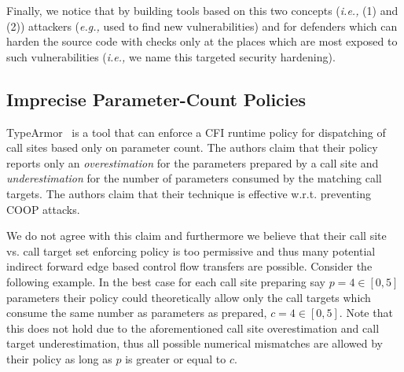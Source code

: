 Finally, we notice that by building tools based on this two concepts (\textit{i.e.,} (1) and (2))
attackers (\textit{e.g.,} used to find new vulnerabilities) and for defenders which can 
harden the source code with checks only at the places which are most exposed 
to such vulnerabilities (\textit{i.e.,} we name this targeted security hardening).

\subsection{Imprecise Parameter-Count Policies}
\label{Too Permissive Parameter-Based Policies}
TypeArmor~\cite{veen:typearmor} is a tool that can enforce a CFI runtime policy for dispatching of call sites based only on
parameter count. The authors claim that their policy reports only an \textit{overestimation} for the parameters prepared by a call site
and \textit{underestimation} for the number of parameters consumed by the matching call targets. The authors claim that their technique is 
effective w.r.t. preventing COOP attacks. 

We do not agree with this claim and furthermore we believe that their call site vs. call target set enforcing policy is too permissive and thus many potential indirect forward edge based 
control flow transfers are possible. Consider the following example. In the best case for each call site preparing say $p=4 \in [0, 5]$ parameters their policy
could theoretically allow only the call targets which consume the same number as parameters as prepared, $c=4 \in [0, 5]$. Note that this does not hold due to 
the aforementioned call site overestimation and call target underestimation, thus all possible numerical mismatches are allowed by their policy as long as $p$ is 
greater or equal to $c$.

